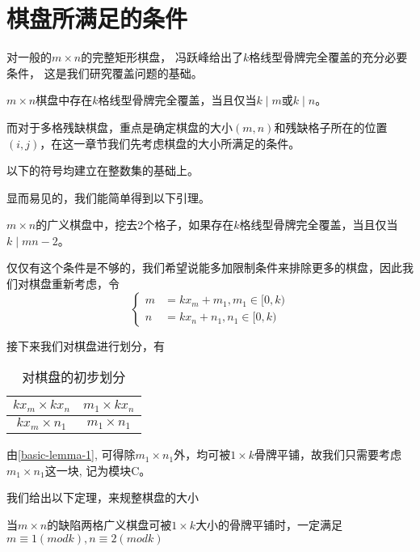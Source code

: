\chapter{棋盘所满足的条件}
\label{cha:sysu-thesis-contents-format-requirement}
对一般的$m \times n$的完整矩形棋盘， 冯跃峰给出了$k$格线型骨牌完全覆盖的充分必要条件， 这是我们研究覆盖问题的基础。

\begin{lemma}
    \label{basic-lemma-1}
    $m \times n$棋盘中存在$k$格线型骨牌完全覆盖，当且仅当$k \mid m$或$k \mid n$。
\end{lemma}

而对于多格残缺棋盘，重点是确定棋盘的大小$(m, n)$和残缺格子所在的位置$(i, j)$，在这一章节我们先考虑棋盘的大小所满足的条件。

以下的符号均建立在整数集的基础上。

显而易见的，我们能简单得到以下引理。
\begin{lemma}
    \label{basic-lemma-2}
    $m \times n$的广义棋盘中，挖去2个格子，如果存在$k$格线型骨牌完全覆盖，当且仅当$k \mid mn-2$。
\end{lemma}

仅仅有这个条件是不够的，我们希望说能多加限制条件来排除更多的棋盘，因此我们对棋盘重新考虑，令
$$
    \left\{
    \begin{aligned}
        m & =  kx_m + m_1, m_1 \in [0, k) \\
        n & =  kx_n + n_1, n_1 \in [0, k)
    \end{aligned}
    \right.
$$

接下来我们对棋盘进行划分，有

\begin{table}[h]
    \centering
    \caption{对棋盘的初步划分}
    \begin{tabular}{|c|c|}

        \hline
        $kx_m \times kx_n$ & $m_1 \times kx_n$ \\
        \hline
        $kx_m \times n_1$  & $m_1 \times n_1$  \\
        \hline
    \end{tabular}
    \label{fig:first-picture}
\end{table}

由\ref*{basic-lemma-1}, 可得除$m_1 \times n_1$外，均可被$1 \times k$骨牌平铺，故我们只需要考虑$m_1 \times n_1$这一块, 记为模块C。

我们给出以下定理，来规整棋盘的大小
\begin{theorem}
    \label{basic-theorem-1}
    当$m \times n$的缺陷两格广义棋盘可被$1 \times k$大小的骨牌平铺时，一定满足$m \equiv 1 (mod k), n \equiv 2 (mod k)$
\end{theorem}

